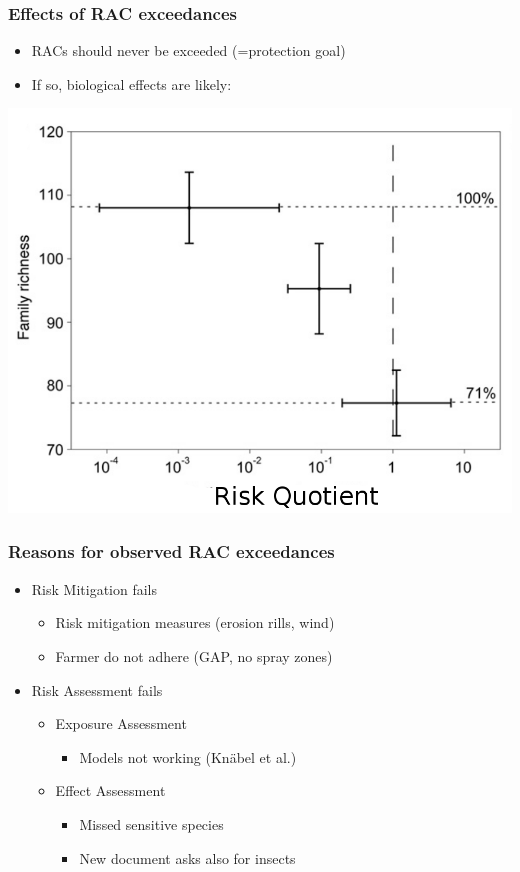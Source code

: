 \documentclass[
	12pt
	]{beamer}
\begin{document}
{%
\begin{frame}
\frametitle{Effects of RAC exceedances}
			\begin{itemize}
				\item RACs should never be exceeded (=protection goal)
				\item If so, biological effects are likely:
			\end{itemize}
	    	    	\includegraphics[height=0.7\textheight]{figs/stehle_pnas_2015_mod.png}
\end{frame}
}



\begin{frame}
\frametitle{Reasons for observed RAC exceedances}
	\begin{itemize}
		\item Risk Mitigation fails
			\begin{itemize}
				\item Risk mitigation measures (erosion rills, wind)
				\item Farmer do not adhere (GAP, no spray zones)
			\end{itemize}
		\item Risk Assessment fails
			\begin{itemize}
				\item Exposure Assessment
					\begin{itemize}
						\item Models not working (Knäbel et al.)
					\end{itemize}
				\item Effect Assessment
					\begin{itemize}
						\item Missed sensitive species
						\item New document asks also for insects
					\end{itemize}
			\end{itemize}

	\end{itemize}
\end{frame}
\end{document}
